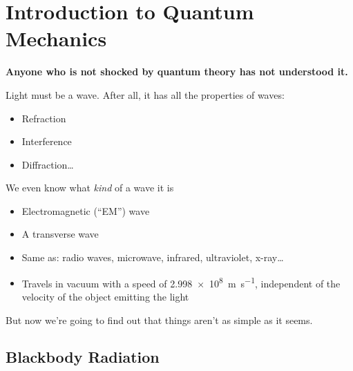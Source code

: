 \chapter{Introduction to Quantum Mechanics}

\begin{definition}
  \textbf{Anyone who is not shocked by quantum theory has not understood it.}

  \vspace{.1in}
\end{definition}




Light must be a wave. After all, it has all the properties of waves:
\begin{itemize}
\item Refraction
\item Interference
\item Diffraction\ldots
\end{itemize}
We even know what \emph{kind} of a wave it is
\begin{itemize}
\item Electromagnetic (``EM'') wave
\item A transverse wave
\item Same as: radio waves, microwave, infrared, ultraviolet, x-ray\ldots
\item Travels in vacuum with a speed of \SI{2.998e8}{\metre\per\second},
  independent of the velocity of the object emitting the light
\end{itemize}
But now we're going to find out that things aren't as simple as it seems.
%
%
%
%
\section{Blackbody Radiation}
\begin{figure}[ht]
  \centering
\end{figure}


